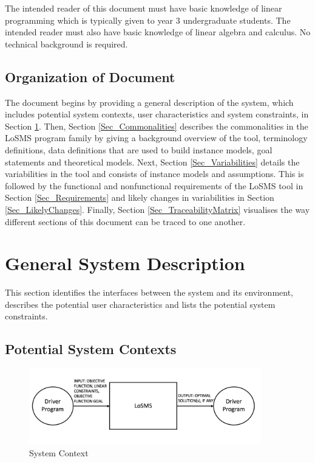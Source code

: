 \documentclass[12pt]{article}
\newcommand{\famname}{LoSMS} %
\begin{document}
The intended reader of this document must have basic knowledge of linear 
programming which is typically given to year 3 undergraduate students. The 
intended reader must also have basic knowledge of linear algebra and calculus. 
No technical background is required.

\subsection{Organization of Document}

The document begins by providing a general description of the system, which 
includes potential system contexts, user characteristics and system 
constraints, in Section \ref{SecSystemDescription}. Then, Section 
\ref{Sec_Commonalities} describes the commonalities in the \famname{} program 
family by giving a background overview of the tool, terminology definitions, 
data definitions that are used to build instance models, goal statements and 
theoretical models. Next, Section \ref{Sec_Variabilities} details the 
variabilities in the tool and consists of instance models and assumptions. This 
is followed by the functional and nonfunctional requirements of the \famname{} 
tool in Section \ref{Sec_Requirements} and likely changes in variabilities in 
Section \ref{Sec_LikelyChanges}. Finally, Section \ref{Sec_TraceabilityMatrix} 
visualises the way different sections of this document can be traced to one 
another. \\

\section{General System Description} \label{SecSystemDescription}

This section identifies the interfaces between the system and its environment,
describes the potential user characteristics and lists the potential system
constraints.

\subsection{Potential System Contexts}

\begin{figure}[h!]
	\begin{center}
		\includegraphics[width=0.9\textwidth, 
		height=0.20\textheight]{system-context}
		\caption{System Context}
		\label{Figure_SystemContext} 
	\end{center}
\end{figure}
\end{document}
